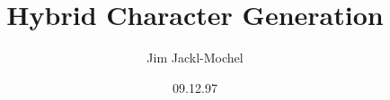 \documentclass{book}
\title{Hybrid Character Generation}
\author{Jim Jackl-Mochel}
\date{09.12.97}
\begin{document}
\maketitle


\begin{multicols}{2}
{\small
\tableofcontents
}
\end{multicols}

\listoftables








\printindex
\end{document}
